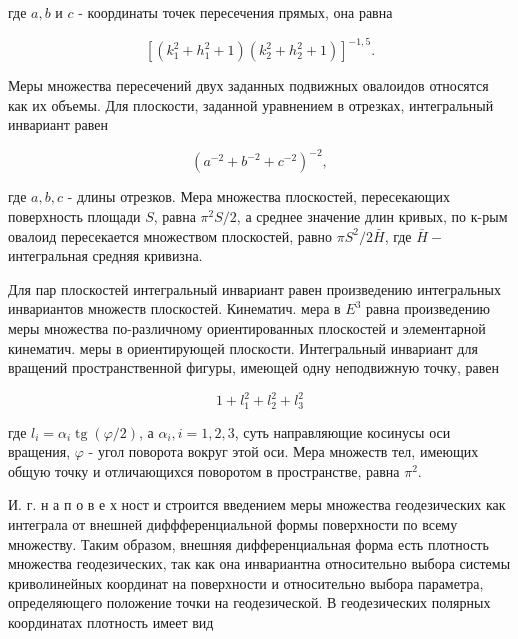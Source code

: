 \documentclass[10pt]{article}
\begin{document}
где $a, b$ и $c$ - координаты точек пересечения прямых, она равна



\[

\left[\left(k_{1}^{2}+h_{1}^{2}+1\right)\left(k_{2}^{2}+h_{2}^{2}+1\right)\right]^{-1,5} .

\]



Меры множества пересечений двух заданных подвижных овалоидов относятся как их объемы. Для плоскости, заданной уравнением в отрезках, интегральный инвариант равен



\[

\left(a^{-2}+b^{-2}+c^{-2}\right)^{-2},

\]



где $a, b, c$ - длины отрезков. Мера множества плоскостей, пересекающих поверхность площади $S$, равна $\pi^{2} S / 2$, а среднее значение длин кривых, по к-рым овалоид пересекается множеством плоскостей, равно $\pi S^{2} / 2 \bar{H}$, где $\bar{H}-$ интегральная средняя кривизна.



Для пар плоскостей интегральный инвариант равен произведению интегральных инвариантов множеств плоскостей. Кинематич. мера в $E^{3}$ равна произведению меры множества по-различному ориентированных плоскостей и элементарной кинематич. меры в ориентирующей плоскости. Интегральный инвариант для вращений пространственной фигуры, имеющей одну неподвижную точку, равен



\[

1+l_{1}^{2}+l_{2}^{2}+l_{3}^{2}

\]



где $l_{i}=\alpha_{i} \operatorname{tg}(\varphi / 2)$, а $\alpha_{i}, i=1,2,3$, суть направляющие косинусы оси вращения, $\varphi$ - угол поворота вокруг этой оси. Мера множеств тел, имеющих общую точку и отличающихся поворотом в пространстве, равна $\pi^{2}$.



И. г. н а п о в е х ност и строится введением меры множества геодезических как интеграла от внешней диффференциальной формы поверхности по всему множеству. Таким образом, внешняя дифференциальная форма есть плотность множества геодезических, так как она инвариантна относительно выбора системы криволинейных координат на поверхности и относительно выбора параметра, определяющего положение точки на геодезической. В геодезических полярных координатах плотность имеет вид
\end{document}
